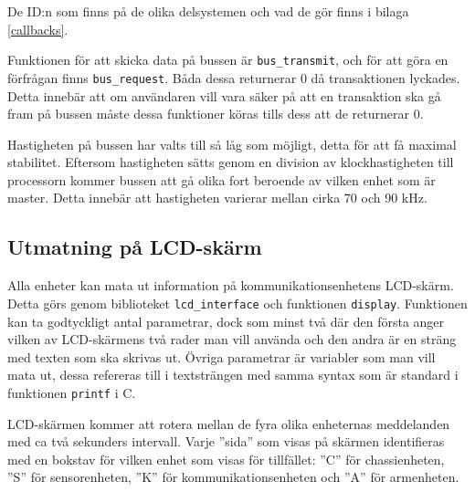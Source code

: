 De ID:n som finns på de olika delsystemen och vad de gör finns i bilaga \ref{callbacks}.

Funktionen för att skicka data på bussen är \verb|bus_transmit|, och för att göra en förfrågan finns \verb|bus_request|. Båda dessa returnerar 0 då transaktionen lyckades. Detta innebär att om användaren vill vara säker på att en transaktion ska gå fram på bussen måste dessa funktioner köras tills dess att de returnerar 0.

Hastigheten på bussen har valts till så låg som möjligt, detta för att få maximal stabilitet. Eftersom hastigheten sätts genom en division av klockhastigheten till processorn kommer bussen att gå olika fort beroende av vilken enhet som är master. Detta innebär att hastigheten varierar mellan cirka 70 och 90 kHz.

\subsection{Utmatning på LCD-skärm}
\label{sec:lcd_interface}

Alla enheter kan mata ut information på kommunikationsenhetens LCD-skärm. Detta görs genom biblioteket \verb|lcd_interface| och funktionen \verb|display|. Funktionen kan ta godtyckligt antal parametrar, dock som minst två där den första anger vilken av LCD-skärmens två rader man vill använda och den andra är en sträng med texten som ska skrivas ut. Övriga parametrar är variabler som man vill mata ut, dessa refereras till i textsträngen med samma syntax som är standard i funktionen \verb|printf| i C.

LCD-skärmen kommer att rotera mellan de fyra olika enheternas meddelanden med ca två sekunders intervall. Varje ''sida'' som visas på skärmen identifieras med en bokstav för vilken enhet som visas för tillfället: ''C'' för chassienheten, ''S'' för sensorenheten, ''K'' för kommunikationsenheten och ''A'' för armenheten.
